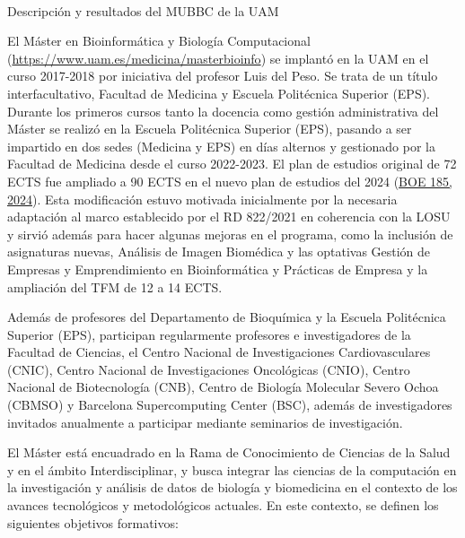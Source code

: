 \documentclass[
  11pt,
  a4paper,
  twoside]{scrreprt}
\makeatletter
\let\oldparagraph\paragraph
\renewcommand{\paragraph}{
    \@ifstar
      \xxxParagraphStar
      \xxxParagraphNoStar
  }
\newcommand{\xxxParagraphStar}[1]{\oldparagraph*{#1}\mbox{}}
\newcommand{\xxxParagraphNoStar}[1]{\oldparagraph{#1}\mbox{}}
\makeatother
\begin{document}
\paragraph{Descripción y resultados del MUBBC de la
UAM}\label{descripciuxf3n-y-resultados-del-mubbc-de-la-uam}

El Máster en Bioinformática y Biología Computacional
(\url{https://www.uam.es/medicina/masterbioinfo}) se implantó en la UAM
en el curso 2017-2018 por iniciativa del profesor Luis del Peso. Se
trata de un título interfacultativo, Facultad de Medicina y Escuela
Politécnica Superior (EPS). Durante los primeros cursos tanto la
docencia como gestión administrativa del Máster se realizó en la Escuela
Politécnica Superior (EPS), pasando a ser impartido en dos sedes
(Medicina y EPS) en días alternos y gestionado por la Facultad de
Medicina desde el curso 2022-2023. El plan de estudios original de 72
ECTS fue ampliado a 90 ECTS en el nuevo plan de estudios del 2024
(\href{https://boe.es/boe/dias/2024/08/01/pdfs/BOE-A-2024-15933.pdf}{BOE
185, 2024}). Esta modificación estuvo motivada inicialmente por la
necesaria adaptación al marco establecido por el RD 822/2021 en
coherencia con la LOSU y sirvió además para hacer algunas mejoras en el
programa, como la inclusión de asignaturas nuevas, Análisis de Imagen
Biomédica y las optativas Gestión de Empresas y Emprendimiento en
Bioinformática y Prácticas de Empresa y la ampliación del TFM de 12 a 14
ECTS.

Además de profesores del Departamento de Bioquímica y la Escuela
Politécnica Superior (EPS), participan regularmente profesores e
investigadores de la Facultad de Ciencias, el Centro Nacional de
Investigaciones Cardiovasculares (CNIC), Centro Nacional de
Investigaciones Oncológicas (CNIO), Centro Nacional de Biotecnología
(CNB), Centro de Biología Molecular Severo Ochoa (CBMSO) y Barcelona
Supercomputing Center (BSC), además de investigadores invitados
anualmente a participar mediante seminarios de investigación.

El Máster está encuadrado en la Rama de Conocimiento de Ciencias de la
Salud y en el ámbito Interdisciplinar, y busca integrar las ciencias de
la computación en la investigación y análisis de datos de biología y
biomedicina en el contexto de los avances tecnológicos y metodológicos
actuales. En este contexto, se definen los siguientes objetivos
formativos:
\end{document}
